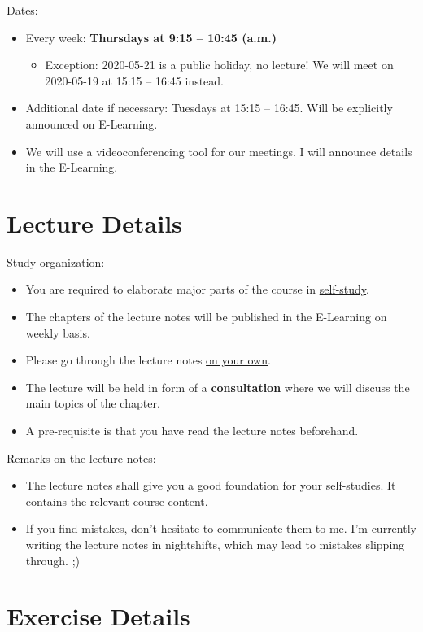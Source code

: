Dates:
\begin{itemize}
	\item Every week: \textbf{Thursdays at 9:15 -- 10:45 (a.m.)}
	\begin{itemize}
		\item Exception: 2020-05-21 is a public holiday, no lecture! We will meet on 2020-05-19 at 15:15 -- 16:45 instead.
	\end{itemize}
	\item Additional date if necessary: Tuesdays at 15:15 -- 16:45. Will be explicitly announced on E-Learning.
	\item We will use a videoconferencing tool for our meetings. I will announce details in the E-Learning.
\end{itemize}


\section{Lecture Details}

Study organization:
\begin{itemize}
	\item You are required to elaborate major parts of the course in \underline{self-study}.
	\item The chapters of the lecture notes will be published in the E-Learning on weekly basis.
	\item Please go through the lecture notes \underline{on your own}.
	\item The lecture will be held in form of a \textbf{consultation} where we will discuss the main topics of the chapter.
	\item A pre-requisite is that you have read the lecture notes beforehand.
\end{itemize}

Remarks on the lecture notes:
\begin{itemize}
	\item The lecture notes shall give you a good foundation for your self-studies. It contains the relevant course content.
	\item If you find mistakes, don't hesitate to communicate them to me. I'm currently writing the lecture notes in nightshifts, which may lead to mistakes slipping through. ;)
\end{itemize}


\section{Exercise Details}

